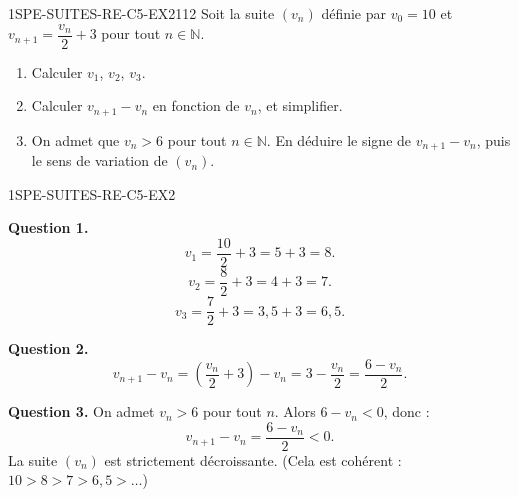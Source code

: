 
\begin{exercice}{1SPE-SUITES-RE-C5-EX2}{1}{12}
Soit la suite $(v_n)$ définie par $v_0 = 10$ et $v_{n+1} = \dfrac{v_n}{2} + 3$ pour tout $n \in \mathbb{N}$.
\begin{enumerate}
  \item Calculer $v_1$, $v_2$, $v_3$.
  \item Calculer $v_{n+1} - v_n$ en fonction de $v_n$, et simplifier.
  \item On admet que $v_n > 6$ pour tout $n \in \mathbb{N}$. En déduire le signe de $v_{n+1} - v_n$, puis le sens de variation de $(v_n)$.
\end{enumerate}
\end{exercice}



\begin{corrige}{1SPE-SUITES-RE-C5-EX2}

\textbf{Question 1.}
\[
v_1 = \frac{10}{2} + 3 = 5 + 3 = 8.
\]
\[
v_2 = \frac{8}{2} + 3 = 4 + 3 = 7.
\]
\[
v_3 = \frac{7}{2} + 3 = 3{,}5 + 3 = 6{,}5.
\]


\textbf{Question 2.}
\[
v_{n+1} - v_n = \left(\frac{v_n}{2} + 3\right) - v_n = 3 - \frac{v_n}{2} = \frac{6 - v_n}{2}.
\]


\textbf{Question 3.} On admet $v_n > 6$ pour tout $n$. Alors $6 - v_n < 0$, donc :
\[
v_{n+1} - v_n = \frac{6 - v_n}{2} < 0.
\]
La suite $(v_n)$ est strictement décroissante. (Cela est cohérent : $10 > 8 > 7 > 6{,}5 > \ldots$)

\end{corrige}

